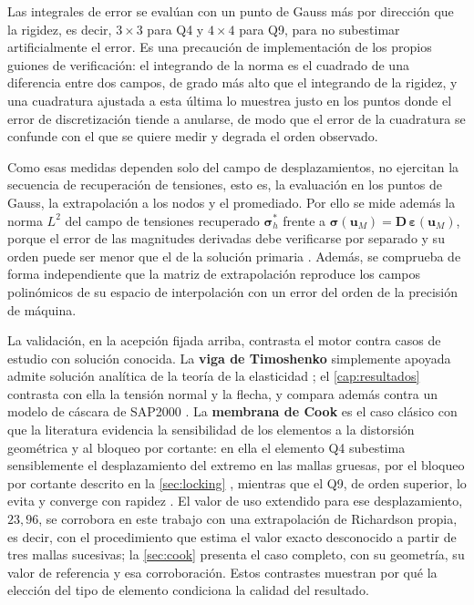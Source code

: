 Las integrales de error se evalúan con un punto de Gauss más por dirección que la rigidez, es decir, $3\times3$ para Q4 y $4\times4$ para Q9, para no subestimar artificialmente el error. Es una precaución de implementación de los propios guiones de verificación: el integrando de la norma es el cuadrado de una diferencia entre dos campos, de grado más alto que el integrando de la rigidez, y una cuadratura ajustada a esta última lo muestrea justo en los puntos donde el error de discretización tiende a anularse, de modo que el error de la cuadratura se confunde con el que se quiere medir y degrada el orden observado.

Como esas medidas dependen solo del campo de desplazamientos, no ejercitan la secuencia de recuperación de tensiones, esto es, la evaluación en los puntos de Gauss, la extrapolación a los nodos y el promediado. Por ello se mide además la norma $L^2$ del campo de tensiones recuperado $\bm{\sigma}^*_h$ frente a $\bm{\sigma}(\bm{u}_M)=\bm{D}\,\bm{\varepsilon}(\bm{u}_M)$, porque el error de las magnitudes derivadas debe verificarse por separado y su orden puede ser menor que el de la solución primaria \autocite[p.~29]{salari2000mms}. Además, se comprueba de forma independiente que la matriz de extrapolación reproduce los campos polinómicos de su espacio de interpolación con un error del orden de la precisión de máquina.

La validación, en la acepción fijada arriba, contrasta el motor contra casos de estudio con solución conocida. La \textbf{viga de Timoshenko} simplemente apoyada admite solución analítica de la teoría de la elasticidad \autocite[art.~21, pp.~39-43]{timoshenko1970elasticity}; el \autoref{cap:resultados} contrasta con ella la tensión normal y la flecha, y compara además contra un modelo de cáscara de SAP2000 \autocite[p.~179]{csi2017sap2000}. La \textbf{membrana de Cook} es el caso clásico con que la literatura evidencia la sensibilidad de los elementos a la distorsión geométrica y al bloqueo por cortante: en ella el elemento Q4 subestima sensiblemente el desplazamiento del extremo en las mallas gruesas, por el bloqueo por cortante descrito en la \autoref{sec:locking} \autocite[pp.~98-99]{cook2002concepts}, mientras que el Q9, de orden superior, lo evita y converge con rapidez \autocite[p.~243]{hughes2000fem}. El valor de uso extendido para ese desplazamiento, $23{,}96$, se corrobora en este trabajo con una extrapolación de Richardson propia, es decir, con el procedimiento que estima el valor exacto desconocido a partir de tres mallas sucesivas; la \autoref{sec:cook} presenta el caso completo, con su geometría, su valor de referencia y esa corroboración. Estos contrastes muestran por qué la elección del tipo de elemento condiciona la calidad del resultado.

